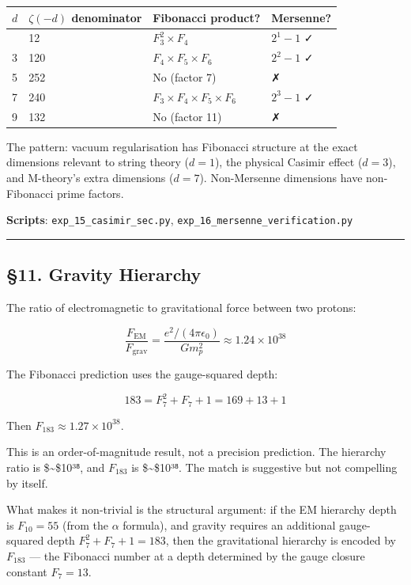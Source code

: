 \documentclass[
  11pt,
  a4paper]{article}
\begin{document}
\begin{longtable}[]{@{}llll@{}}
\toprule\noalign{}
\(d\) & \(\zeta(-d)\) denominator & Fibonacci product? & Mersenne? \\
\midrule\noalign{}
\endhead
\bottomrule\noalign{}
\endlastfoot
1 & 12 & \(F_3^2 \times F_4\) & \(2^1 - 1\) ✓ \\
3 & 120 & \(F_4 \times F_5 \times F_6\) & \(2^2 - 1\) ✓ \\
5 & 252 & No (factor 7) & ✗ \\
7 & 240 & \(F_3 \times F_4 \times F_5 \times F_6\) & \(2^3 - 1\) ✓ \\
9 & 132 & No (factor 11) & ✗ \\
\end{longtable}

The pattern: vacuum regularisation has Fibonacci structure at the exact
dimensions relevant to string theory (\(d = 1\)), the physical Casimir
effect (\(d = 3\)), and M-theory's extra dimensions (\(d = 7\)).
Non-Mersenne dimensions have non-Fibonacci prime factors.

\textbf{Scripts}: \texttt{exp\_15\_casimir\_sec.py},
\texttt{exp\_16\_mersenne\_verification.py}

\begin{center}\rule{0.5\linewidth}{0.5pt}\end{center}

\subsection{§11. Gravity Hierarchy}\label{gravity-hierarchy}

The ratio of electromagnetic to gravitational force between two protons:

\[\frac{F_{\text{EM}}}{F_{\text{grav}}} = \frac{e^2/(4\pi\epsilon_0)}{Gm_p^2} \approx 1.24 \times 10^{38}\]

The Fibonacci prediction uses the gauge-squared depth:

\[183 = F_7^2 + F_7 + 1 = 169 + 13 + 1\]

Then \(F_{183} \approx 1.27 \times 10^{38}\).

This is an order-of-magnitude result, not a precision prediction. The
hierarchy ratio is \$\sim\$10³⁸, and \(F_{183}\) is \$\sim\$10³⁸. The
match is suggestive but not compelling by itself.

What makes it non-trivial is the structural argument: if the EM
hierarchy depth is \(F_{10} = 55\) (from the \(\alpha\) formula), and
gravity requires an additional gauge-squared depth
\(F_7^2 + F_7 + 1 = 183\), then the gravitational hierarchy is encoded
by \(F_{183}\) --- the Fibonacci number at a depth determined by the
gauge closure constant \(F_7 = 13\).
\end{document}
